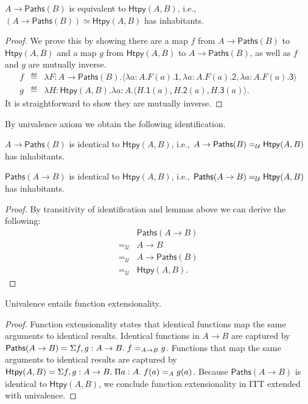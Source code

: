 \documentclass{article}
\newcommand{\calU}{\mathcal{U}}
\begin{document}
\begin{lemma}
	$A \to \mathsf{Paths}(B)$ is equivalent to $\mathsf{Htpy}(A,B)$, i.e., $(A 
	\to \mathsf{Paths}(B)) \simeq \mathsf{Htpy}(A,B)$ has inhabitants.
\end{lemma}
\begin{proof}
	We prove this by showing there are a map $f$ from $A \to 
	\mathsf{Paths}(B)$ to $\mathsf{Htpy}(A,B)$ and a map $g$ from 
	$\mathsf{Htpy}(A,B)$ to $A \to \mathsf{Paths}(B)$, as well as $f$ and $g$ 
	are mutually inverse.
	\[
	\begin{array}{rcl}
	f & \eqdef & \lambda F : A \to \mathsf{Paths}(B). \langle \lambda a : A. 
	F(a).\mathsf{1}, \lambda a : A. F(a).\mathsf{2}, \lambda a:A. 
	F(a).\mathsf{3} \rangle \\
	g & \eqdef & \lambda H : \mathsf{Htpy}(A,B). \lambda a : A. \langle 
	H.\mathsf{1}(a), H.\mathsf{2}(a), H.\mathsf{3}(a) \rangle.
	\end{array}
	\] 
	It is straightforward to show they are mutually inverse.
\end{proof}

By univalence axiom we obtain the following identification.

\begin{corollary}
	$A \to \mathsf{Paths}(B)$ is identical to $\mathsf{Htpy}(A,B)$, i.e., 
	$\Ideq{\calU}{A \to \mathsf{Paths}(B)}{\mathsf{Htpy}(A,B)}$ has 
	inhabitants.
\end{corollary}

\begin{lemma}
	$\mathsf{Paths}(A \to B)$ is identical to $\mathsf{Htpy}(A,B)$, i.e., 
	$\Ideq{\calU}{\mathsf{Paths}(A \to B)}{\mathsf{Htpy}(A,B)}$ has 
	inhabitants.
\end{lemma}
\begin{proof}
	By transitivity of identification and lemmas above we can derive the 
	following:
	\[
	\begin{array}{cl}
	& \mathsf{Paths}(A \to B) \\
	=_{\calU} & A \to B \\
	=_{\calU} & A \to \mathsf{Paths}(B) \\
	=_{\calU} & \mathsf{Htpy}(A,B).
	\end{array}
	\]
\end{proof}

\begin{corollary}
	Univalence entails function extensionality.
\end{corollary}
\begin{proof}
	Function extensionality states that identical functions map the same 
	arguments to identical results.
	Identical functions in $A \to B$ are captured by $\mathsf{Paths}(A\to B) = 
	\hsigtype{f,g}{A\to B}{ \Ideq{A \to B}{f}{g} }$.
	Functions that map the same arguments to identical results are captured  by 
	$\mathsf{Htpy}(A,B) = \hsigtype{f,g}{A \to B}{ \hpitype{a}{A}{ 
	\Ideq{A}{f(a)}{g(a)} } }$.
	Because $\mathsf{Paths}(A \to B)$ is identical to $\mathsf{Htpy}(A,B)$, we 
	conclude function extensionality in ITT extended with univalence.
\end{proof}
\end{document}
